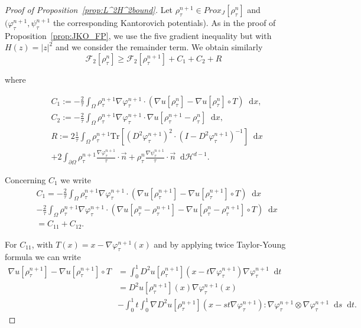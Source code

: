 \documentclass[a4paper,twosided, 11pt]{article}
\newcommand {\f}   {\frac}
\newcommand {\p}   {\partial}
\theoremstyle{plain}
\theoremstyle{remark}
\newcommand{\diff}{\mathop{}\!\mathrm{d}}
\numberwithin{equation}{section}
\begin{document}
\begin{proof}[Proof of Proposition~\ref{prop:L^2H^2bound}]
Let $\rho^{n+1}_{\tau}\in Prox_{J}[\rho^{n}_{\tau}]$ and $(\varphi^{n+1}_{\tau},\psi^{n+1}_{\tau}$ the corresponding Kantorovich potentials). As in the proof of Proposition~\ref{prop:JKO_FP}, we use the five gradient inequality but with $H(z)=|z|^2$ and we consider the remainder term. 
We obtain similarly
$$
\mathcal{F}_{2}[\rho_{\tau}^{n}]\ge \mathcal{F}_{2}[\rho_{\tau}^{n+1}] + C_1 + C_2 + R
$$

where 

\begin{align*}
&C_1 := -\f{2}{\tau}\int_{\Omega} \rho_{\tau}^{n+1} \nabla\varphi_{\tau}^{n+1}\cdot (\nabla u[\rho_{\tau}^{n}]  -\nabla u[\rho_{\tau}^{n}] \circ T)\diff x, \\
&C_2 :=- \f{2}{\tau}\int_{\Omega} \rho_{\tau}^{n+1} \nabla\varphi_{\tau}^{n+1}\cdot \nabla u[\rho_{\tau}^{n+1}-\rho_{\tau}^{n}]\diff x, \\
&R := 2\f{1}{\tau}\int_{\Omega}\rho_{\tau}^{n+1} \mathrm{Tr}[(D^2\varphi_{\tau}^{n+1})^2 \cdot(I-D^2\varphi_{\tau}^{n+1})^{-1}]\diff x\\
&+2\int_{\p\Omega}\rho_{\tau}^{n+1} \f{\nabla\varphi_{\tau}^{n+1}}{\tau}\cdot \vec{n} +  \rho_{\tau}^{n} \f{\nabla\psi_{\tau}^{n+1}}{\tau}\cdot\vec{n}\diff \mathcal{H}^{d-1}. 
\end{align*}

Concerning $C_1$ we write
\begin{align*}
&C_1 =  -\f{2}{\tau}\int_{\Omega} \rho_{\tau}^{n+1} \nabla\varphi_{\tau}^{n+1}\cdot (\nabla u[\rho_{\tau}^{n+1}]- \nabla u[\rho_{\tau}^{n+1}] \circ T) \diff x\\
&- \f{2}{\tau}\int_{\Omega} \rho_{\tau}^{n+1} \nabla\varphi_{\tau}^{n+1}\cdot (\nabla u[\rho_{\tau}^{n}-\rho_{\tau}^{n+1}]- \nabla u[\rho_{\tau}^{n}-\rho_{\tau}^{n+1}] \circ T)\diff x \\
&= C_{11} + C_{12}. 
\end{align*}

For $C_{11}$, with $T(x)= x-\nabla\varphi^{n+1}_{\tau}(x)$ and by applying twice Taylor-Young formula we can write
\begin{align*}
\nabla u[\rho^{n+1}_{\tau}] - \nabla u[\rho^{n+1}_{\tau}]\circ T &= \int_{0}^{1} D^{2}u[\rho^{n+1}_{\tau}](x- t\nabla\varphi^{n+1}_{\tau})\nabla\varphi^{n+1}_{\tau}\diff t\\
&= D^{2}u[\rho^{n+1}_{\tau}](x)\nabla\varphi^{n+1}_{\tau}(x) \\ &- \int_{0}^{1}t\int_{0}^{1} \nabla D^{2} u[\rho^{n+1}_{\tau}](x-st\nabla\varphi^{n+1}_{\tau}): \nabla\varphi^{n+1}_{\tau}\otimes\nabla\varphi^{n+1}_{\tau}\diff s \diff t.
\end{align*}


\end{proof}
\end{document}
